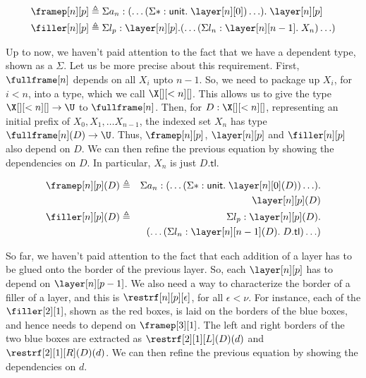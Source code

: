 \documentclass[10pt]{art.cls/art}
\newcommand{\unittype}{\ensuremath{\mathsf{unit}}}
\newcommand{\unitpoint}{\ensuremath{\ast}}
\newcommand{\defeq}{\ensuremath{\triangleq}}
\newcommand{\tl}{\ensuremath{\mathsf{tl}}}
\begin{document}
\begin{align*}
  \framep[n][p] & \defeq \Sigma a_n : (\ldots (\Sigma \unitpoint : \unittype .\; \layer[n][0]) \ldots) .\; \layer[n][p] \\
  \filler[n][p] & \defeq \Sigma l_p : \layer[n][p] . (\ldots (\Sigma l_n : \layer[n][n - 1] .\; X_n) \ldots)
\end{align*}

Up to now, we haven't paid attention to the fact that we have a dependent type, shown as a $\Sigma$. Let us be more precise about this requirement. First, $\fullframe[n]$ depends on all $X_i$ upto $n - 1$. So, we need to package up $X_i$, for $i < n$, into a type, which we call $\X[][<n][]$. This allows us to give the type $\X[][<n][] \rightarrow \U$ to $\fullframe[n]$. Then, for $D: \X[][<n][]$, representing an initial prefix of $X_0, X_1, \ldots X_{n - 1}$, the indexed set $X_n$ has type $\fullframe[n](D) \rightarrow \U$. Thus, $\framep[n][p]$, $\layer[n][p]$ and $\filler[n][p]$ also depend on $D$. We can then refine the previous equation by showing the dependencies on $D$. In particular, $X_n$ is just $D.\tl$.

\begin{align*}
  \framep[n][p](D) & \defeq & \Sigma a_n : (\ldots (\Sigma \unitpoint : \unittype .\; \layer[n][0](D)) \ldots) . \\
                   &        & \layer[n][p](D)                                                                    \\
  \filler[n][p](D) & \defeq & \Sigma l_p : \layer[n][p](D) .                                                     \\
                   &        & (\ldots (\Sigma l_n : \layer[n][n - 1](D) .\; D.\tl) \ldots)
\end{align*}

So far, we haven't paid attention to the fact that each addition of a layer has to be glued onto the border of the previous layer. So, each $\layer[n][p]$ has to depend on $\layer[n][p - 1]$. We also need a way to characterize the border of a filler of a layer, and this is $\restrf[n][p][\epsilon]$, for all $\epsilon < \nu$. For instance, each of the $\filler[2][1]$, shown as the red boxes, is laid on the borders of the blue boxes, and hence needs to depend on $\framep[3][1]$. The left and right borders of the two blue boxes are extracted as $\restrf[2][1][L](D)(d)$ and $\restrf[2][1][R](D)(d)$. We can then refine the previous equation by showing the dependencies on $d$.
\end{document}
